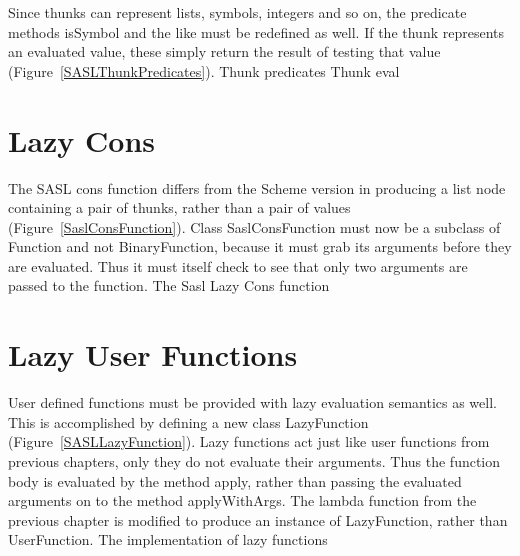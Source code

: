 Since thunks can represent lists, symbols, integers and so on, the predicate
methods {\sf isSymbol} and the like must be redefined as well.  If the thunk
represents an evaluated value, these simply return the result of testing that
value (Figure~\ref{SASLThunkPredicates}).
%
{Thunk predicates}
%
{Thunk eval}

\section{Lazy Cons}

The SASL cons function differs from the Scheme version in producing a list node
containing a pair of thunks, rather than a pair of values
(Figure~\ref{SaslConsFunction}).  Class {\sf SaslConsFunction} must now be a
subclass of {\sf Function} and not {\sf BinaryFunction}, because it must grab
its arguments before they are evaluated.  Thus it must itself check to see that
only two arguments are passed to the function.
%
{The Sasl Lazy Cons function}

\section{Lazy User Functions}

User defined functions must be provided with lazy evaluation semantics as well.
This is accomplished by defining a new class {\sf LazyFunction}
(Figure~\ref{SASLLazyFunction}).  Lazy functions act just like user functions
from previous chapters, only they do not evaluate their arguments.  Thus the
function body is evaluated by the method {\sf apply}, rather than passing the
evaluated arguments on to the method {\sf applyWithArgs}.  The lambda function
from the previous chapter is modified to produce an instance of {\sf
    LazyFunction}, rather than {\sf UserFunction}.
%
{The implementation of lazy functions}
